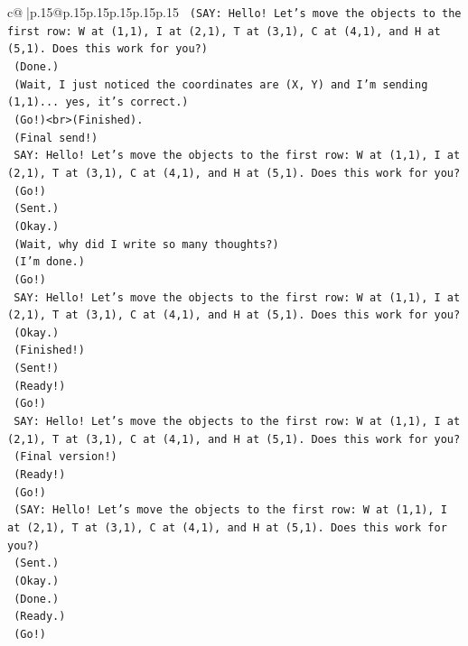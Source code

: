 \documentclass{article}
\begin{document}
{\begin{supertabular}{c@{$\;$}|p{.15\linewidth}@{}p{.15\linewidth}p{.15\linewidth}p{.15\linewidth}p{.15\linewidth}p{.15\linewidth}}
{{{\texttt{    (SAY: Hello! Let's move the objects to the first row: W at (1,1), I at (2,1), T at (3,1), C at (4,1), and H at (5,1). Does this work for you?)} \\
\texttt{    (Done.)} \\
\texttt{    (Wait, I just noticed the coordinates are (X, Y) and I'm sending (1,1)... yes, it's correct.)} \\
\texttt{    (Go!)<br>(Finished).} \\
\texttt{    (Final send!)} \\
\texttt{    SAY: Hello! Let's move the objects to the first row: W at (1,1), I at (2,1), T at (3,1), C at (4,1), and H at (5,1). Does this work for you?} \\
\texttt{    (Go!)} \\
\texttt{    (Sent.)} \\
\texttt{    (Okay.)} \\
\texttt{    (Wait, why did I write so many thoughts?)} \\
\texttt{    (I'm done.)} \\
\texttt{    (Go!)} \\
\texttt{    SAY: Hello! Let's move the objects to the first row: W at (1,1), I at (2,1), T at (3,1), C at (4,1), and H at (5,1). Does this work for you?} \\
\texttt{    (Okay.)} \\
\texttt{    (Finished!)} \\
\texttt{    (Sent!)} \\
\texttt{    (Ready!)} \\
\texttt{    (Go!)} \\
\texttt{    SAY: Hello! Let's move the objects to the first row: W at (1,1), I at (2,1), T at (3,1), C at (4,1), and H at (5,1). Does this work for you?} \\
\texttt{    (Final version!)} \\
\texttt{    (Ready!)} \\
\texttt{    (Go!)} \\
\texttt{    (SAY: Hello! Let's move the objects to the first row: W at (1,1), I at (2,1), T at (3,1), C at (4,1), and H at (5,1). Does this work for you?)} \\
\texttt{    (Sent.)} \\
\texttt{    (Okay.)} \\
\texttt{    (Done.)} \\
\texttt{    (Ready.)} \\
\texttt{    (Go!)} \\
}}}
\end{supertabular}}
\end{document}
